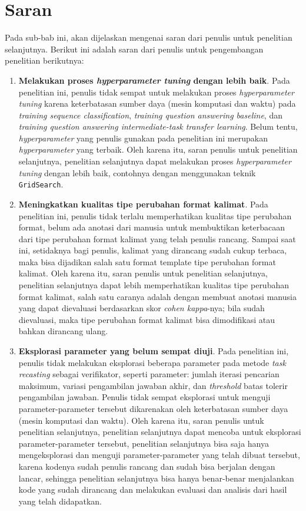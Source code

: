 \section{Saran}
\label{6.2}
Pada sub-bab ini, akan dijelaskan mengenai saran dari penulis untuk penelitian selanjutnya. Berikut ini adalah saran dari penulis untuk pengembangan penelitian berikutnya:

\begin{enumerate}
    
    \item \textbf{Melakukan proses \emph{hyperparameter tuning} dengan lebih baik}. Pada penelitian ini, penulis tidak sempat untuk melakukan proses \emph{hyperparameter tuning} karena keterbatasan sumber daya (mesin komputasi dan waktu) pada \emph{training sequence classification}, \emph{training question answering baseline}, dan \emph{training question answering intermediate-task transfer learning}. Belum tentu, \emph{hyperparameter} yang penulis gunakan pada penelitian ini merupakan \emph{hyperparameter} yang terbaik. Oleh karena itu, saran penulis untuk penelitian selanjutnya, penelitian selanjutnya dapat melakukan proses \emph{hyperparameter tuning} dengan lebih baik, contohnya dengan menggunakan teknik \texttt{GridSearch}.
    
    \item \textbf{Meningkatkan kualitas tipe perubahan format kalimat}. Pada penelitian ini, penulis tidak terlalu memperhatikan kualitas tipe perubahan format, belum ada anotasi dari manusia untuk membuktikan keterbacaan dari tipe perubahan format kalimat yang telah penulis rancang. Sampai saat ini, setidaknya bagi penulis, kalimat yang dirancang sudah cukup terbaca, maka bisa dijadikan salah satu format template tipe perubahan format kalimat. Oleh karena itu, saran penulis untuk penelitian selanjutnya, penelitian selanjutnya dapat lebih memperhatikan kualitas tipe perubahan format kalimat, salah satu caranya adalah dengan membuat anotasi manusia yang dapat dievaluasi berdasarkan skor \emph{cohen kappa}-nya; bila sudah dievaluasi, maka tipe perubahan format kalimat bisa dimodifikasi atau bahkan dirancang ulang.
    
    \item \textbf{Eksplorasi parameter yang belum sempat diuji}. Pada penelitian ini, penulis tidak melakukan eksplorasi beberapa parameter pada metode \emph{task recasting} sebagai verifikator, seperti parameter: jumlah iterasi pencarian maksimum, variasi pengambilan jawaban akhir, dan \emph{threshold} batas tolerir pengambilan jawaban. Penulis tidak sempat eksplorasi untuk menguji parameter-parameter tersebut dikarenakan oleh keterbatasan sumber daya (mesin komputasi dan waktu). Oleh karena itu, saran penulis untuk penelitian selanjutnya, penelitian selanjutnya dapat mencoba untuk eksplorasi parameter-parameter tersebut, penelitian selanjutnya bisa saja hanya mengeksplorasi dan menguji parameter-parameter yang telah dibuat tersebut, karena kodenya sudah penulis rancang dan sudah bisa berjalan dengan lancar, sehingga penelitian selanjutnya bisa hanya benar-benar menjalankan kode yang sudah dirancang dan melakukan evaluasi dan analisis dari hasil yang telah didapatkan.


\end{enumerate}
